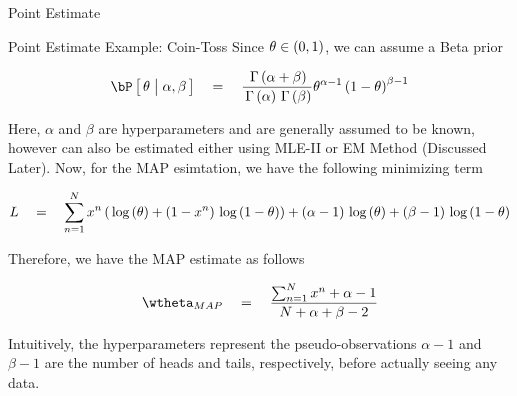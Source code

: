 \documentclass{article}
\begin{document}
\begin{ssection}{Point Estimate}
\begin{ssubsection}{Point Estimate Example: Coin-Toss}
		Since $\theta \in \left( {0, 1} \right)$, we can assume a Beta prior

		\begin{align*}
			\prob{\theta \pipe \alpha, \beta}	\eq	\frac{\func{\Gamma}{\alpha + \beta}}{\func{\Gamma}{\alpha} \func{\Gamma}{\beta}} \theta^{\alpha - 1} \para{1 - \theta}^{\beta - 1}
		\end{align*}

		Here, $\alpha$ and $\beta$ are hyperparameters and are generally assumed to be known, however can also be estimated either using MLE-II or EM Method (Discussed Later). Now, for the MAP esimtation, we have the following minimizing term

		\begin{align*}
			L	\eq	\sum_{n = 1}^N x^n \para{\log{\theta} + \para{1 - x^n} \log{1 - \theta}} + \para{\alpha - 1} \log{\theta} + \para{\beta - 1} \log{1 - \theta}
		\end{align*}

		Therefore, we have the MAP estimate as follows

		\begin{align*}
			\wtheta_{MAP}	\eq	\frac{\sum_{n = 1}^N x^n + \alpha - 1}{N + \alpha + \beta - 2}
		\end{align*}

		Intuitively, the hyperparameters represent the pseudo-observations  $\alpha - 1$ and $\beta - 1$ are the number of heads and tails, respectively, before actually seeing any data.

	\end{ssubsection}

\end{ssection}
\end{document}
